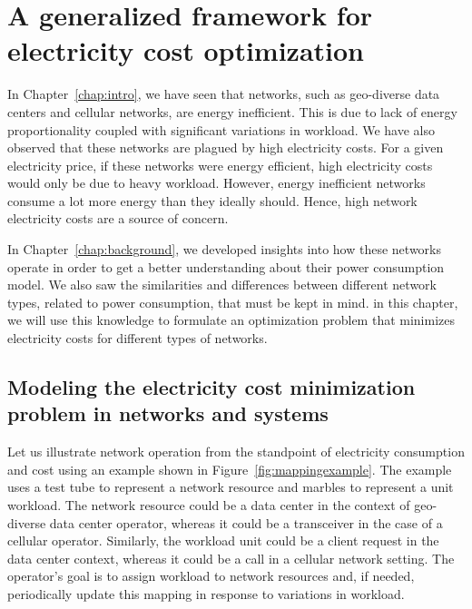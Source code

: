\chapter{A generalized framework for electricity cost optimization}
\label{chap:framework} In Chapter~\ref{chap:intro}, we have seen that networks, such as geo-diverse data centers and cellular networks, are energy inefficient. This is due to lack of energy proportionality coupled with significant variations in workload. We have also observed that these networks are plagued by high electricity costs. For a given electricity price, if these networks were energy efficient, high electricity costs would only be due to heavy workload. However, energy inefficient networks consume a lot more energy than they ideally should. Hence, high network electricity costs are a source of concern. 

In Chapter~\ref{chap:background}, we developed insights into how these networks operate in order to get a better understanding about their power consumption model. We also saw the similarities and differences between different network types, related to power consumption, that must be kept in mind. in this chapter, we will use this knowledge to formulate an optimization problem that minimizes electricity costs for different types of networks.


\section{Modeling the electricity cost minimization problem in networks and systems} %

Let us illustrate network operation from the standpoint of electricity consumption and cost using an example shown in Figure~\ref{fig:mappingexample}. The example uses a test tube to represent a network resource and marbles to represent a unit workload. The network resource could be a data center in the context of geo-diverse data center operator, whereas it could be a transceiver in the case of a cellular operator. Similarly, the workload unit could be a client request in the data center context, whereas it could be a call in a cellular network setting. The operator's goal is to assign workload to network resources and, if needed, periodically update this mapping in response to variations in workload.

